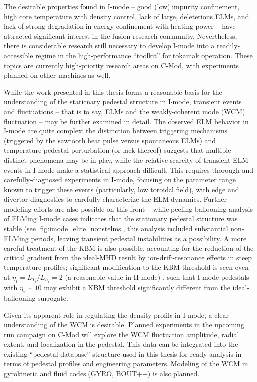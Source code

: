 The desirable properties found in I-mode -- good (low) impurity confinement, high core temperature with density control, lack of large, deleterious ELMs, and lack of strong degradation in energy confinement with heating power -- have attracted significant interest in the fusion research community.  Nevertheless, there is considerable research still necessary to develop I-mode into a readily-accessible regime in the high-performance ``toolkit'' for tokamak operation.  These topics are currently high-priority research areas on C-Mod, with experiments planned on other machines as well.

While the work presented in this thesis forms a reasonable basis for the understanding of the stationary pedestal structure in I-mode, transient events and fluctuations -- that is to say, ELMs and the weakly-coherent mode (WCM) fluctuation -- may be further examined in detail.  The observed ELM behavior in I-mode are quite complex: the distinction between triggering mechanisms (\ie triggered by the sawtooth heat pulse versus spontaneous ELMs) and temperature pedestal perturbation (or lack thereof) suggests that multiple distinct phenomena may be in play, while the relative scarcity of transient ELM events in I-mode make a statistical approach difficult.  This requires thorough and carefully-diagnosed experiments in I-mode, focusing on the parameter range known to trigger these events (particularly, low toroidal field), with edge and divertor diagnostics to carefully characterize the ELM dynamics.  Further modeling efforts are also possible on this front -- while peeling-ballooning analysis of ELMing I-mode cases indicates that the stationary pedestal structure was stable (see \cref{fig:imode_elite_nonstelms}, this analysis included substantial non-ELMing periods, leaving transient pedestal instabilities as a possibility.  A more careful treatment of the KBM is also possible, accounting for the reduction of the critical gradient from the ideal-MHD result by ion-drift-resonance effects in steep temperature profiles; significant modification to the KBM threshold is seen even at $\eta_i = L_{T_i}/L_{n_i} = 2$ (a reasonable value in H-mode) \cite{Snyder2001}, such that I-mode pedestals with $\eta_i \sim 10$ \cite{Whyte2010} may exhibit a KBM threshold significantly different from the ideal-ballooning surrogate.

Given its apparent role in regulating the density profile in I-mode, a clear understanding of the WCM is desirable.  Planned experiments in the upcoming run campaign on C-Mod will explore the WCM fluctuation amplitude, radial extent, and localization in the pedestal.  This data can be integrated into the existing ``pedestal database'' structure used in this thesis for ready analysis in terms of pedestal profiles and engineering parameters.  Modeling of the WCM in gyrokinetic and fluid codes (\eg GYRO, BOUT++) is also planned.

